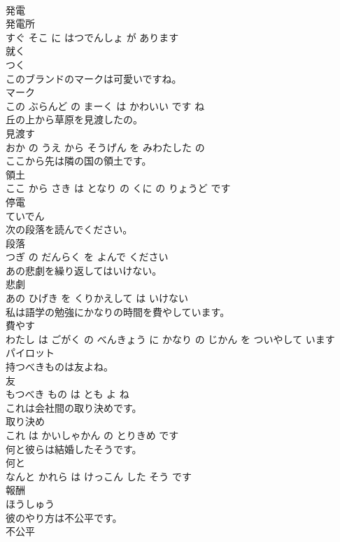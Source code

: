 \documentclass[8pt]{extreport}
\begin{document}
\begin{CJK}{UTF8}{min}
\\	発電 
\\	発電所 
\\	すぐ そこ に はつでんしょ が あります			
\\	就く	
\\	つく			
\\	このブランドのマークは可愛いですね。	
\\	マーク 
\\	この ぶらんど の まーく は かわいい です ね			
\\	丘の上から草原を見渡したの。	
\\	見渡す 
\\	おか の うえ から そうげん を みわたした の			
\\	ここから先は隣の国の領土です。	
\\	領土 
\\	ここ から さき は となり の くに の りょうど です			
\\	停電	
\\	ていでん			
\\	次の段落を読んでください。	
\\	段落 
\\	つぎ の だんらく を よんで ください			
\\	あの悲劇を繰り返してはいけない。	
\\	悲劇 
\\	あの ひげき を くりかえして は いけない			
\\	私は語学の勉強にかなりの時間を費やしています。	
\\	費やす 
\\	わたし は ごがく の べんきょう に かなり の じかん を ついやして います			
\\	パイロット	
\\	持つべきものは友よね。	
\\	友 
\\	もつべき もの は とも よ ね			
\\	これは会社間の取り決めです。	
\\	取り決め 
\\	これ は かいしゃかん の とりきめ です			
\\	何と彼らは結婚したそうです。	
\\	何と 
\\	なんと かれら は けっこん した そう です			
\\	報酬	
\\	ほうしゅう			
\\	彼のやり方は不公平です。	
\\	不公平 

\end{CJK}
\end{document}
